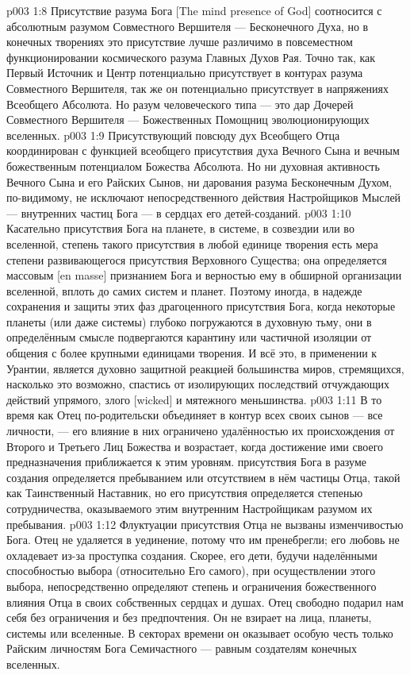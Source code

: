 \vs p003 1:8 Присутствие разума Бога [The mind presence of God] соотносится с абсолютным разумом Совместного Вершителя --- Бесконечного Духа, но в конечных творениях это присутствие лучше различимо в повсеместном функционировании космического разума Главных Духов Рая. Точно так, как Первый Источник и Центр потенциально присутствует в контурах разума Совместного Вершителя, так же он потенциально присутствует в напряжениях Всеобщего Абсолюта. Но разум человеческого типа --- это дар Дочерей Совместного Вершителя --- Божественных Помощниц эволюционирующих вселенных.
\vs p003 1:9 Присутствующий повсюду дух Всеобщего Отца координирован с функцией всеобщего присутствия духа Вечного Сына и вечным божественным потенциалом Божества Абсолюта. Но ни духовная активность Вечного Сына и его Райских Сынов, ни дарования разума Бесконечным Духом, по\hyp{}видимому, не исключают непосредственного действия Настройщиков Мыслей --- внутренних частиц Бога --- в сердцах его детей\hyp{}созданий.
\vs p003 1:10 Касательно присутствия Бога на планете, в системе, в созвездии или во вселенной, степень такого присутствия в любой единице творения есть мера степени развивающегося присутствия Верховного Существа; она определяется массовым [en masse] признанием Бога и верностью ему в обширной организации вселенной, вплоть до самих систем и планет. Поэтому иногда, в надежде сохранения и защиты этих фаз драгоценного присутствия Бога, когда некоторые планеты (или даже системы) глубоко погружаются в духовную тьму, они в определённым смысле подвергаются карантину или частичной изоляции от общения с более крупными единицами творения. И всё это, в применении к Урантии, является духовно защитной реакцией большинства миров, стремящихся, насколько это возможно, спастись от изолирующих последствий отчуждающих действий упрямого, злого [wicked] и мятежного меньшинства.
\vs p003 1:11 \pc В то время как Отец по\hyp{}родительски объединяет в контур всех своих сынов --- все личности, --- его влияние в них ограничено удалённостью их происхождения от Второго и Третьего Лиц Божества и возрастает, когда достижение ими своего предназначения приближается к этим уровням.  присутствия Бога в разуме создания определяется пребыванием или отсутствием в нём частицы Отца, такой как Таинственный Наставник, но  его присутствия определяется степенью сотрудничества, оказываемого этим внутренним Настройщикам разумом их пребывания.
\vs p003 1:12 Флуктуации присутствия Отца не вызваны изменчивостью Бога. Отец не удаляется в уединение, потому что им пренебрегли; его любовь не охладевает из\hyp{}за проступка создания. Скорее, его дети, будучи наделёнными способностью выбора (относительно Его самого), при осуществлении этого выбора, непосредственно определяют степень и ограничения божественного влияния Отца в своих собственных сердцах и душах. Отец свободно подарил нам себя без ограничения и без предпочтения. Он не взирает на лица, планеты, системы или вселенные. В секторах времени он оказывает особую честь только Райским личностям Бога Семичастного --- равным создателям конечных вселенных.

